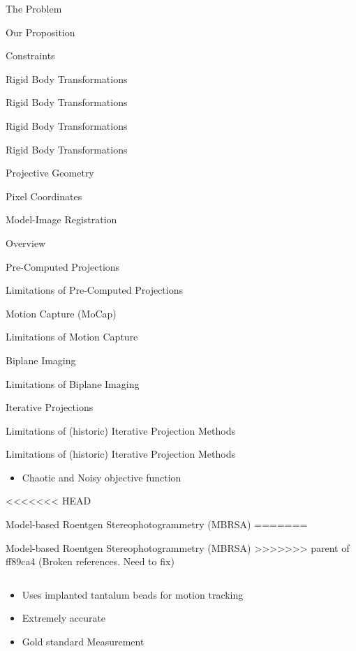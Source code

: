 \documentclass[presentation, aspectratio=1610]{beamer}
\begin{document}
\begin{frame}[label={sec:org51bdd62}]{The Problem}
\begin{frame}[label={sec:org827823c}]{Our Proposition}
\begin{frame}[label={sec:org8655799}]{Constraints}
\begin{frame}[label={sec:orgb624cd0}]{Rigid Body Transformations}
\begin{frame}[label={sec:org66cfa5c}]{Rigid Body Transformations}
\begin{frame}[label={sec:orga8040ec}]{Rigid Body Transformations}
\begin{frame}[label={sec:org2c45bb0}]{Rigid Body Transformations}
\begin{frame}[label={sec:orgc08b8a8}]{Projective Geometry}
\begin{frame}[label={sec:org9004faf}]{Pixel Coordinates}
\begin{frame}[label={sec:orgf5a9f37}]{Model-Image Registration}
\begin{frame}[label={sec:orgd132949}]{Overview}
\begin{frame}[label={sec:org3bacc15}]{Pre-Computed Projections}
\begin{frame}[label={sec:org9c71b5d}]{Limitations of Pre-Computed Projections}
\begin{frame}[label={sec:org0b4ee4b}]{Motion Capture (MoCap)}
\begin{frame}[label={sec:org8d150bb}]{Limitations of Motion Capture}
\begin{frame}[label={sec:orgb0b4d92}]{Biplane Imaging}
\begin{frame}[label={sec:org4d6375c}]{Limitations of Biplane Imaging}
\begin{frame}[label={sec:org2fdd7da}]{Iterative Projections}
\begin{frame}[label={sec:org64525aa}]{Limitations of (historic) Iterative Projection Methods}
\begin{frame}[label={sec:org04d16d4}]{Limitations of (historic) Iterative Projection Methods}
\begin{itemize}
\begin{itemize}
\item Pose initialization
\item Escaping local minima
\item Implant detection
\end{itemize}
\item Chaotic and Noisy objective function
\end{itemize}
\end{frame}

<<<<<<< HEAD
\begin{frame}[label={sec:org4dff9c3}]{Model-based Roentgen Stereophotogrammetry (MBRSA)}
=======
\begin{frame}[label={sec:org1844ed1}]{Model-based Roentgen Stereophotogrammetry (MBRSA)}
>>>>>>> parent of ff89ca4 (Broken references. Need to fix)
\begin{columns}
\begin{column}{0.5\columnwidth}
\begin{itemize}
\item Uses implanted tantalum beads for motion tracking \autocite{selvikRoentgenStereophotogrammetryMethod1989}
\item Extremely accurate \autocites{kapteinEvaluationThreePose2004}[][]{saariKneeKinematicsMedial2005}
\item Gold standard Measurement \autocite{brobergValidationMachineLearning2023}
\end{itemize}
\end{column}


\end{columns}
\end{frame}
\end{frame}
\end{frame}
\end{frame}
\end{frame}
\end{frame}
\end{frame}
\end{frame}
\end{frame}
\end{frame}
\end{frame}
\end{frame}
\end{frame}
\end{frame}
\end{frame}
\end{frame}
\end{frame}
\end{frame}
\end{frame}
\end{frame}
\end{frame}
\end{document}
